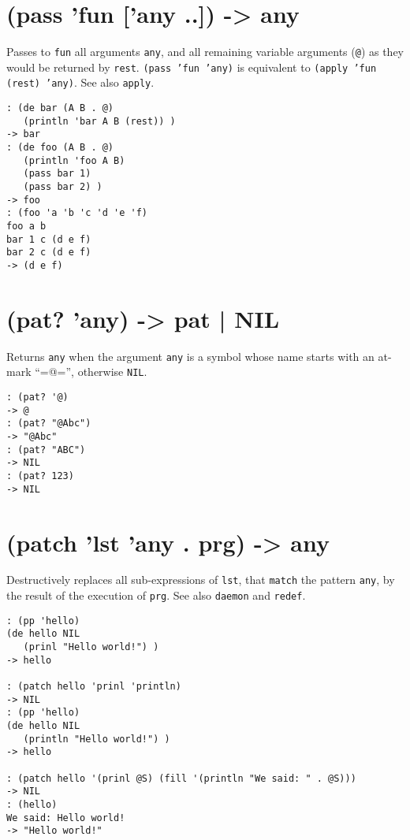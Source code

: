 {{{{{{{ 
\section{(pass 'fun ['any ..]) -> any}
\label{sec-8-1-16-8}


Passes to \texttt{fun} all arguments \texttt{any}, and all remaining variable
arguments (\texttt{@}) as they would be returned by \texttt{rest}. \texttt{(pass 'fun 'any)}
is equivalent to \texttt{(apply 'fun (rest) 'any)}. See also \texttt{apply}.


\begin{verbatim}
: (de bar (A B . @)
   (println 'bar A B (rest)) )
-> bar
: (de foo (A B . @)
   (println 'foo A B)
   (pass bar 1)
   (pass bar 2) )
-> foo
: (foo 'a 'b 'c 'd 'e 'f)
foo a b
bar 1 c (d e f)
bar 2 c (d e f)
-> (d e f)
\end{verbatim}

 
\section{(pat? 'any) -> pat | NIL}
\label{sec-8-1-16-9}


Returns \texttt{any} when the argument \texttt{any} is a symbol whose name starts with
an at-mark ``=@='', otherwise \texttt{NIL}.


\begin{verbatim}
: (pat? '@)
-> @
: (pat? "@Abc")
-> "@Abc"
: (pat? "ABC")
-> NIL
: (pat? 123)
-> NIL
\end{verbatim}

 
\section{(patch 'lst 'any . prg) -> any}
\label{sec-8-1-16-10}


Destructively replaces all sub-expressions of \texttt{lst}, that \texttt{match} the
pattern \texttt{any}, by the result of the execution of \texttt{prg}. See also
\texttt{daemon} and \texttt{redef}.


\begin{verbatim}
: (pp 'hello)
(de hello NIL
   (prinl "Hello world!") )
-> hello

: (patch hello 'prinl 'println)
-> NIL
: (pp 'hello)
(de hello NIL
   (println "Hello world!") )
-> hello

: (patch hello '(prinl @S) (fill '(println "We said: " . @S)))
-> NIL
: (hello)
We said: Hello world!
-> "Hello world!"
\end{verbatim}

}}}}}}}
